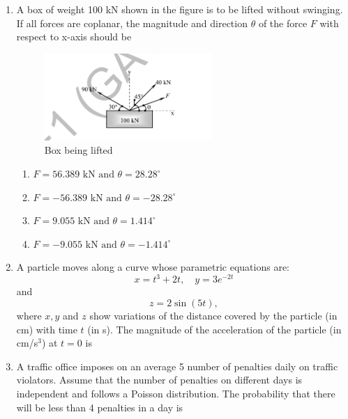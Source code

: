 \documentclass[journal,12pt,onecolumn]{IEEEtran}
\theoremstyle{remark}
\begin{document}
\begin{enumerate}
\item A box of weight 100 kN shown in the figure is to be lifted without swinging. If all forces are coplanar, the magnitude and direction \(\theta\) of the force \(F\) with respect to x-axis should be \hfill{}

\begin{figure}[H]
    \centering
    \includegraphics[width=0.6\textwidth]{figs/image8.png}
    \caption{Box being lifted}
    \label{fig:q27}
\end{figure}

\begin{multicols}{4}
\begin{enumerate}
\item \(F = 56.389 \text{ kN and } \theta = 28.28^\circ\)
\item \(F = -56.389 \text{ kN and } \theta = -28.28^\circ\)
\item \(F = 9.055 \text{ kN and } \theta = 1.414^\circ\)
\item \(F = -9.055 \text{ kN and } \theta = -1.414^\circ\)
\end{enumerate}
\end{multicols}

\item A particle moves along a curve whose parametric equations are:
\[
x = t^3 + 2t, \quad y = 3 e^{-2t}
\]
and
\[
z = 2 \sin(5t),
\]
where \(x, y\) and \(z\) show variations of the distance covered by the particle (in cm) with time \(t\) (in s). The magnitude of the acceleration of the particle (in cm/s\(^3\)) at \(t=0\) is \hfill{}

\item A traffic office imposes on an average 5 number of penalties daily on traffic violators. Assume that the number of penalties on different days is independent and follows a Poisson distribution. The probability that there will be less than 4 penalties in a day is  \hfill{}







\end{enumerate}
\end{document}
